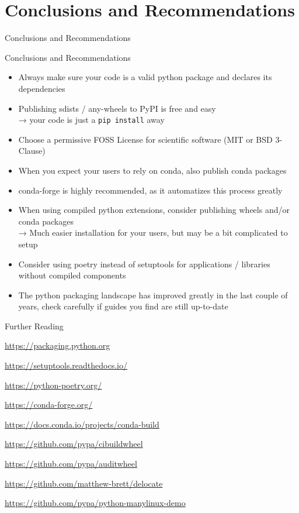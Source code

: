 \documentclass[
  aspectratio=1610,
]{beamer}
\newcommand\headlineframe[1]{%
  \begin{frame}[c]%
    \begin{center}%
      \Huge\color{vertexDarkRed}#1%
    \end{center}%
  \end{frame}%
}%
\begin{document}
\section{Conclusions and Recommendations}
\headlineframe{Conclusions and Recommendations}

\begin{frame}[c]{Conclusions and Recommendations}
  \begin{itemize}
    \item Always make sure your code is a valid python package and declares its dependencies
    \item Publishing sdists / any-wheels to PyPI is free and easy \\
      → your code is just a \texttt{pip install} away
    \item Choose a permissive FOSS License for scientific software (MIT or BSD 3-Clause)
    \item When you expect your users to rely on conda, also publish conda packages
    \item conda-forge is highly recommended, as it automatizes this process greatly
    \item When using compiled python extensions, consider publishing wheels and/or conda packages \\
      → Much easier installation for your users, but may be a bit complicated to setup
    \item Consider using poetry instead of setuptools for applications / libraries without compiled components
    \item The python packaging landscape has improved greatly in the last couple of years, check carefully if guides
      you find are still up-to-date
  \end{itemize}
\end{frame}

\begin{frame}[c]{Further Reading}
  \begin{description}
    \item[PyPA User Guide] \url{https://packaging.python.org}
    \item[setuptools docs] \url{https://setuptools.readthedocs.io/}
    \item[poetry] \url{https://python-poetry.org/}

    \medskip
    \item[conda-forge] \url{https://conda-forge.org/}
    \item[conda build docs] \url{https://docs.conda.io/projects/conda-build}

    \medskip
    \item[cibuildhweel] \url{https://github.com/pypa/cibuildwheel}
    \item[auditwheel] \url{https://github.com/pypa/auditwheel}
    \item[delocate] \url{https://github.com/matthew-brett/delocate}
    \item[manylinux demo] \url{https://github.com/pypa/python-manylinux-demo}
  \end{description}
\end{frame}
\end{document}
